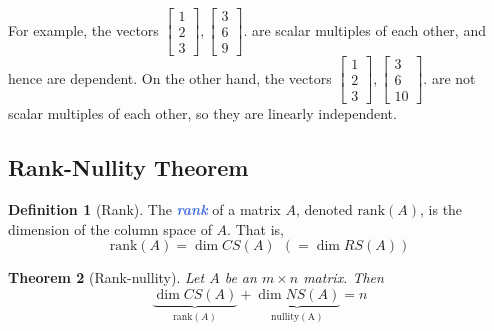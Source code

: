 \documentclass[10pt]{article}
\newcommand{\demph}[1]{\textcolor{RoyalBlue}{\textbf{\slshape #1}}} %
\newtheorem{theorem}{Theorem}
\theoremstyle{definition}
\newtheorem{definition}[theorem]{Definition}
\begin{document}
For example, the vectors $  \begin{bmatrix}
  1\\2\\3
\end{bmatrix},
\begin{bmatrix}
  3\\6\\9
\end{bmatrix}.
$ are scalar multiples of each other, and
hence are dependent. On the other hand, the vectors $  \begin{bmatrix}
  1\\2\\3
\end{bmatrix},
\begin{bmatrix}
  3\\6\\10
\end{bmatrix}.
 $ are not scalar multiples of each other, so they are linearly independent.


\subsection{Rank-Nullity Theorem}

\begin{definition}[Rank]
  The \demph{rank} of a matrix $A$, denoted $\text{rank}(A)$, is the dimension
  of the column space of $A$. That is,
  \begin{equation*}
    \text{rank}(A) = \dim CS(A) \ \ (= \dim RS(A))
  \end{equation*}
\end{definition}

\begin{theorem}[Rank-nullity]
  \label{thm:rank-nullity}
  Let $A$ be an $m\times n$ matrix. Then
  \begin{equation*}
    \underbrace{\dim CS(A)}_{\mathrm{rank}(A)} + \underbrace{\dim NS(A)}_{\mathrm{nullity(A)}} = n
  \end{equation*}
\end{theorem}
\end{document}
